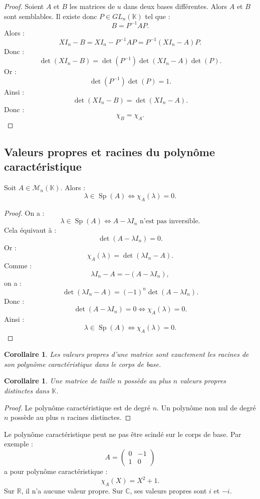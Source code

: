 \documentclass[11pt,a4paper]{article}
\newcommand{\K}{\mathbb K}
\newcommand{\R}{\mathbb R}
\newcommand{\C}{\mathbb C}
\newcommand{\M}{\mathcal M}
\newcommand{\Sp}{\operatorname{Sp}}
\newtheorem{corollaire}[prop]{Corollaire}
\begin{document}
\begin{proof}
Soient \(A\) et \(B\) les matrices de \(u\) dans deux bases différentes.  
Alors \(A\) et \(B\) sont semblables.  
Il existe donc \(P\in GL_n(\K)\) tel que :
\[
B=P^{-1}AP.
\]
Alors :
\[
XI_n-B
=
XI_n-P^{-1}AP
=
P^{-1}(XI_n-A)P.
\]
Donc :
\[
\det(XI_n-B)
=
\det(P^{-1})\det(XI_n-A)\det(P).
\]
Or :
\[
\det(P^{-1})\det(P)=1.
\]
Ainsi :
\[
\det(XI_n-B)=\det(XI_n-A).
\]
Donc :
\[
\chi_B=\chi_A.
\]
\end{proof}

\subsection{Valeurs propres et racines du polynôme caractéristique}

\begin{theorembox}
Soit \(A\in\M_n(\K)\).  
Alors :
\[
\lambda\in\Sp(A)
\Longleftrightarrow
\chi_A(\lambda)=0.
\]
\end{theorembox}

\begin{proof}
On a :
\[
\lambda\in\Sp(A)
\Longleftrightarrow
A-\lambda I_n\text{ n'est pas inversible}.
\]
Cela équivaut à :
\[
\det(A-\lambda I_n)=0.
\]
Or :
\[
\chi_A(\lambda)=\det(\lambda I_n-A).
\]
Comme :
\[
\lambda I_n-A=-(A-\lambda I_n),
\]
on a :
\[
\det(\lambda I_n-A)=(-1)^n\det(A-\lambda I_n).
\]
Donc :
\[
\det(A-\lambda I_n)=0
\Longleftrightarrow
\chi_A(\lambda)=0.
\]
Ainsi :
\[
\lambda\in\Sp(A)
\Longleftrightarrow
\chi_A(\lambda)=0.
\]
\end{proof}

\begin{corollaire}
Les valeurs propres d'une matrice sont exactement les racines de son polynôme caractéristique dans le corps de base.
\end{corollaire}

\begin{corollaire}
Une matrice de taille \(n\) possède au plus \(n\) valeurs propres distinctes dans \(\K\).
\end{corollaire}

\begin{proof}
Le polynôme caractéristique est de degré \(n\).  
Un polynôme non nul de degré \(n\) possède au plus \(n\) racines distinctes.
\end{proof}

\begin{erreurbox}
Le polynôme caractéristique peut ne pas être scindé sur le corps de base.  
Par exemple :
\[
A=
\begin{pmatrix}
0&-1\\
1&0
\end{pmatrix}
\]
a pour polynôme caractéristique :
\[
\chi_A(X)=X^2+1.
\]
Sur \(\R\), il n'a aucune valeur propre.  
Sur \(\C\), ses valeurs propres sont \(i\) et \(-i\).
\end{erreurbox}
\end{document}
